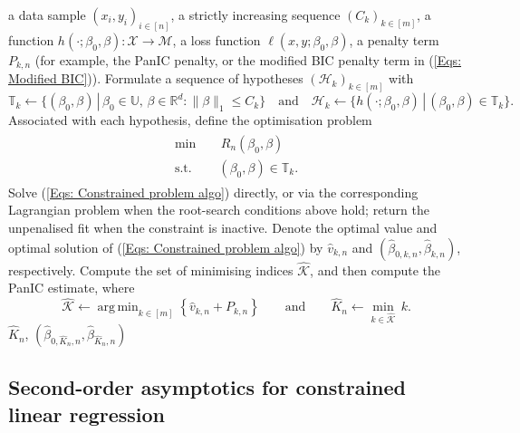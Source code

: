 \documentclass[12pt]{article}
\DeclareMathOperator*{\argmin}{arg\,min}
\theoremstyle{remark}
\theoremstyle{plain}
\begin{document}
\begin{algorithm}[H]
\small
\caption{Computing the Lasso solution with PanIC.}
\label{Algo: PanIC Lasso} \begin{algorithmic}[1] \Require a data sample $(x_{i},y_{i})_{i\in\left[n\right]}$, a strictly increasing sequence
$(C_{k})_{k\in\left[m\right]}$, a function $h(\cdot;\beta_{0},\beta):\mathcal{X}\to\mathcal{M}$,
a loss function $\ell(x,y;\beta_{0},\beta)$,
a penalty term $P_{k,n}$ (for example, the PanIC penalty, or the
modified BIC penalty term in (\ref{Eqs: Modified BIC})). \State
Formulate a sequence of hypotheses $(\mathcal{H}_{k})_{k\in\left[m\right]}$
with
\[
\mathbb{T}_{k}\gets\{(\beta_{0},\beta)\,|\,\beta_{0}\in\mathbb{U},\,\beta\in\mathbb{R}^{d}:\lVert\beta\rVert_{1}\leq C_{k}\} \quad \text{and} \quad \mathcal{H}_{k}\gets\{h(\cdot;\beta_{0},\beta)\,|\,(\beta_{0},\beta)\in\mathbb{T}_{k}\}.
\]
Associated with each hypothesis, define the optimisation problem
\begin{align}
\begin{split}\min\quad & \,R_{n}(\beta_{0},\beta)\\
\mathrm{s.t.}\quad & (\beta_{0},\beta)\in\mathbb{T}_{k}.
\end{split}
\label{Eqs: Constrained problem algo}
\end{align}
 \State Solve (\ref{Eqs: Constrained problem algo})
directly, or via the corresponding Lagrangian problem when the root-search conditions above hold; return the unpenalised fit when the constraint is inactive.
\State Denote the optimal value and optimal solution of (\ref{Eqs: Constrained problem algo}) by $\widehat v_{k,n}$ and $(\hat{\beta}_{0,k,n},\hat{\beta}_{k,n})$, respectively.
\EndFor \State Compute the set of minimising indices $\hat{\mathcal{K}}$, and then compute the PanIC estimate, where
\[
\hat{\mathcal{K}}\gets\argmin_{k\in\left[m\right]}\left\{ \widehat v_{k,n}+P_{k,n}\right\} \qquad \text{and} \qquad \hat{K}_{n}\gets\min_{k\in\hat{\mathcal{K}}}\,k.
\]
\Return $\hat{K}_{n}$, $(\hat{\beta}_{0,\hat{K}_{n},n},\hat{\beta}_{\hat{K}_{n},n})$
\end{algorithmic}
\end{algorithm}

\subsection{Second-order asymptotics for constrained linear regression}

\label{Sect: Asymptotic-distribution}
\end{document}
